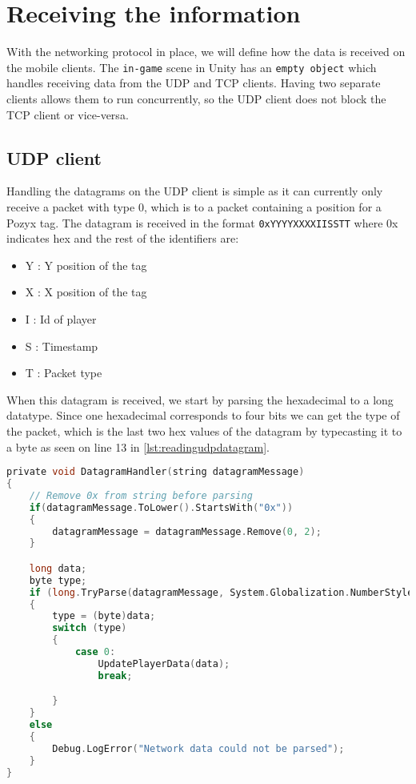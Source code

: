 \section{Receiving the information}
With the networking protocol in place, we will define how the data is received on the mobile clients.
The \texttt{in-game} scene in Unity has an \texttt{empty object} which handles receiving data from the UDP and TCP clients.
Having two separate clients allows them to run concurrently, so the UDP client does not block the TCP client or vice-versa.

\subsection*{UDP client}
Handling the datagrams on the UDP client is simple as it can currently only receive a packet with type 0, which is to a packet containing a position for a Pozyx tag.
The datagram is received in the format \texttt{0xYYYYXXXXIISSTT} where 0x indicates hex and the rest of the identifiers are:
\begin{itemize}
    \item Y : Y position of the tag
    \item X : X position of the tag
    \item I : Id of player
    \item S : Timestamp
    \item T : Packet type
\end{itemize}

\noindent
When this datagram is received, we start by parsing the hexadecimal to a long datatype.
Since one hexadecimal corresponds to four bits we can get the type of the packet, which is the last two hex values of the datagram by typecasting it to a byte as seen on line 13 in \autoref{lst:readingudpdatagram}.

\begin{lstlisting}[caption={Processing datagrams in UDP client}, captionpos=b,language=C,label={lst:readingudpdatagram}]
private void DatagramHandler(string datagramMessage)
{
    // Remove 0x from string before parsing
    if(datagramMessage.ToLower().StartsWith("0x"))
    {
        datagramMessage = datagramMessage.Remove(0, 2);
    }

    long data;
    byte type;
    if (long.TryParse(datagramMessage, System.Globalization.NumberStyles.HexNumber, System.Globalization.CultureInfo.InvariantCulture, out data))
    {
        type = (byte)data;
        switch (type)
        {
            case 0:
                UpdatePlayerData(data);
                break;

        }
    }
    else
    {
        Debug.LogError("Network data could not be parsed");
    }
}
\end{lstlisting}


